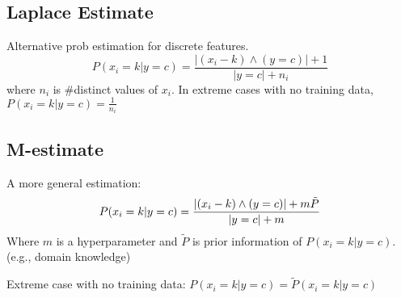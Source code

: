 \subsection*{Laplace Estimate}
Alternative prob estimation for discrete features.
\[P(x_i = k| y = c) = \frac{|(x_i - k)\wedge (y=c)|+1}{|y=c|+n_i}\]
where $n_i$ is \#distinct values of $x_i$.
In extreme cases with no training data, $P(x_i = k| y = c) = \frac{1}{n_i}$\\

\subsection*{M-estimate}
A more general estimation:
\[P(x_i = k| y = c) = \\\\\frac{|(x_i - k)\wedge (y=c)|+m\tilde{P}}{|y=c|+m}\]
Where $m$ is a hyperparameter and $\tilde{P}$ is prior information of ${P}(x_i = k| y = c)$. 
(e.g., domain knowledge)

Extreme case with no training data: $P(x_i = k| y = c) = \tilde{P}(x_i = k| y = c)$